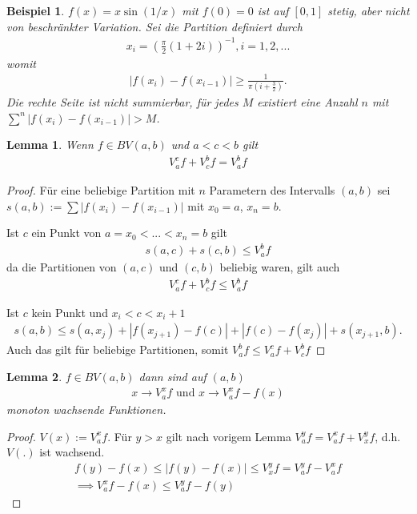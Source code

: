 \documentclass[]{article}
\newtheorem{lemma}{Lemma}
\newtheorem*{example}{Beispiel}
\begin{document}
\begin{example}
	$f(x) = x \sin(1/x)$ mit $f(0) = 0$ ist auf $[0,1]$ stetig, aber nicht von beschränkter Variation. Sei die Partition definiert durch
	\begin{align*}
		x_i = \left( \frac{\pi}{2} (1+2i) \right)^{-1}, i=1,2,...
	\end{align*}
	womit
	\begin{align*}
		|f(x_i) - f(x_{i-1})| \geq \frac{1}{\pi (i+\frac{3}{2})}.
	\end{align*}
	Die rechte Seite ist nicht summierbar, für jedes $M$ existiert eine Anzahl $n$ mit $\sum^n |f(x_i) - f(x_{i-1})| > M$.
\end{example}
\begin{lemma}
	Wenn $f \in BV(a,b)$ und $a<c<b$ gilt
	\begin{align*}
		V_a^c f + V_c^b f = V_a^b f
	\end{align*}
\end{lemma}
\begin{proof}
	Für eine beliebige Partition mit $n$ Parametern des Intervalls $(a,b)$ sei $s(a,b) := \sum |f(x_i) - f(x_{i-1})|$ mit $x_0=a$, $x_n=b$.
	
	Ist $c$ ein Punkt von $a=x_0 < ... < x_n = b$ gilt
	\begin{align*}
		s(a,c) + s(c,b) \leq V_a^b f
	\end{align*}
	da die Partitionen von $(a,c)$ und $(c,b)$ beliebig waren, gilt auch
	\begin{align*}
		V_a^c f + V_c^b f \leq V_a^b f
	\end{align*}

	Ist $c$ kein Punkt und $x_i < c < x_i+1$
	\begin{align*}
		s(a,b) \leq s(a,x_j) + |f(x_{j+1}) - f(c)| + |f(c) - f(x_j)| + s(x_{j+1}, b).
	\end{align*}
	Auch das gilt für beliebige Partitionen, somit $V_a^b f \leq V_a^c f + V_c^b f$
\end{proof}
\begin{lemma}
	$f\in BV(a,b)$ dann sind auf $(a,b)$
	\begin{align*}
		x \rightarrow V_a^x f \text{ und } x \rightarrow V_a^x f - f(x)
	\end{align*}
	monoton wachsende Funktionen.
\end{lemma}
\begin{proof}
	$V(x) := V_a^x f$. Für $y > x$ gilt nach vorigem Lemma $V_a^y f = V_a^x f + V_x^y f$, d.h. $V(.)$ ist wachsend.
	\begin{align*}
		f(y) - f(x) \leq |f(y) - f(x)| \leq V_x^y f = V_a^y f - V_a^x f\\
		\implies V_a^x f - f(x) \leq V_a^y f - f(y)
	\end{align*}
\end{proof}
\end{document}
